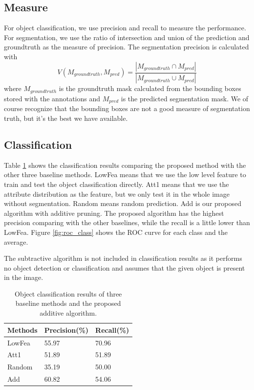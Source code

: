 \documentclass[10pt,twocolumn,letterpaper]{article}
\begin{document}
\subsection{Measure}
\label{ssec:measure}

For object classification, we use precision and recall to measure the performance. 
For segmentation, we use the ratio of intersection and union of the prediction and 
groundtruth as the measure of precision. The segmentation
precision is calculated with
\[ V(M_{groundtruth},M_{pred}) = \frac{|M_{groundtruth} \cap M_{pred}|}{|M_{groundtruth} \cup M_{pred}|} \]
where $M_{groundtruth}$ is the groundtruth mask calculated from the
bounding boxes stored with the annotations and $M_{pred}$ is the
predicted segmentation mask.  We of course recognize that the
bounding boxes are not a good measure of segmentation truth, but
it's the best we have available.\\

\subsection{Classification}
\label{ssec:classification}

Table \ref{table:aresults} shows the classification results comparing the proposed method with 
the other three baseline methods. LowFea means that we use the low level feature to train and test 
the object classification directly. Att1 means that we use the attribute distribution as the feature,
but we only test it in the whole image without segmentation. Random means random prediction. Add is our
proposed algorithm with additive pruning. The proposed algorithm has the highest precision comparing 
with the other baselines, while the recall is a little lower than LowFea. Figure \ref{fig:roc_class} 
shows the ROC curve for each class and the average.

The subtractive algorithm is not included in classification results as it performs no
object detection or classification and assumes that the given object is present
in the image.


\begin{table}
\centering
\begin{tabular}{|l|l|l|}
\hline Methods & Precision(\%) & Recall(\%) \\
\hline LowFea  & 55.97 & 70.96 \\
\hline Att1    & 51.89 & 51.89 \\
\hline Random  & 35.19 & 50.00 \\
\hline Add     & 60.82 & 54.06 \\
\hline
\end{tabular}
\caption{Object classification results of three baseline methods and the proposed additive algorithm.}
\label{table:aresults}
\end{table}
\end{document}
